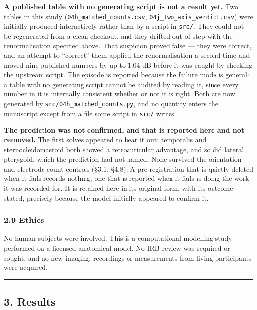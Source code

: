 \documentclass[
  11pt,
  letterpaper,
]{article}
\begin{document}
\textbf{A published table with no generating script is not a result yet.} Two tables
in this study (\texttt{04h\_matched\_counts.csv}, \texttt{04j\_two\_axis\_verdict.csv}) were
initially produced interactively rather than by a script in \texttt{src/}. They could
not be regenerated from a clean checkout, and they drifted out of step with the
renormalisation specified above. That suspicion proved false --- they were
correct, and an attempt to ``correct'' them applied the renormalisation a second
time and moved nine published numbers by up to 1.04 dB before it was caught by
checking the upstream script. The episode is reported because the failure mode
is general: a table with no generating script cannot be audited by reading it,
since every number in it is internally consistent whether or not it is right.
Both are now generated by \texttt{src/04h\_matched\_counts.py}, and no quantity enters
the manuscript except from a file some script in \texttt{src/} writes.

\textbf{The prediction was not confirmed, and that is reported here and not removed.}
The first solves appeared to bear it out: temporalis and sternocleidomastoid
both showed a retroauricular advantage, and so did lateral pterygoid, which the
prediction had not named. None survived the orientation and electrode-count
controls (\S{}3.1, \S{}4.8). A pre-registration that is quietly deleted when it fails
records nothing; one that is reported when it fails is doing the work it was
recorded for. It is retained here in its original form, with its outcome stated,
precisely because the model initially appeared to confirm it.

\subsubsection{2.9 Ethics}\label{ethics}

No human subjects were involved. This is a computational modelling study
performed on a licensed anatomical model. No IRB review was required or sought,
and no new imaging, recordings or measurements from living participants were
acquired.

\begin{center}\rule{0.5\linewidth}{0.5pt}\end{center}

\subsection{3. Results}\label{results}
\end{document}
